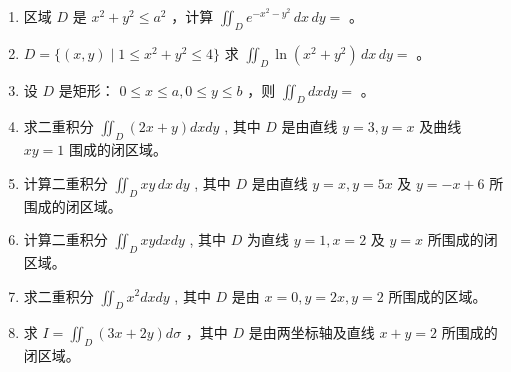 \documentclass[12pt, a4paper]{article}
\begin{document}
\begin{enumerate}
    \item 区域 $D$ 是 $ x^{2} + y^{2} \leq a^{2} $ ，计算 $ \iint_{D} e^{-x^{2}-y^{2}} \, dx \, dy = $ \underline{\hspace{2cm}}。

    \item $ D = \{(x, y) \mid 1 \leq x^{2} + y^{2} \leq 4\} $ 求 $ \iint_{D} \ln(x^{2} + y^{2}) \, dx \, dy = $ \underline{\hspace{2cm}}。

    \item 设 $D$ 是矩形： $ 0 \leq x \leq a, 0 \leq y \leq b $ ，则 $ \iint_{D} dxdy = $ \underline{\hspace{2cm}}。

    \item 求二重积分 $ \iint_{D}(2x+y)dxdy $ , 其中 $D$ 是由直线 $y=3, y=x$ 及曲线 $xy=1$ 围成的闭区域。

    \item 计算二重积分 $ \iint_{D} xy \, dx \, dy $ , 其中 $D$ 是由直线 $ y = x, y = 5x $ 及 $ y = -x + 6 $ 所围成的闭区域。

    \item 计算二重积分 $ \iint_{D} xydxdy $ , 其中 $D$ 为直线 $ y = 1, x = 2 $ 及 $ y = x $ 所围成的闭区域。

    \item 求二重积分 $ \iint_{D} x^{2} dx dy $ , 其中 $D$ 是由 $ x = 0, y = 2x, y = 2 $ 所围成的区域。

    \item 求 $ I = \iint_{D} (3x + 2y) d\sigma $ ，其中 $D$ 是由两坐标轴及直线 $ x + y = 2 $ 所围成的闭区域。
\end{enumerate}
\end{document}
